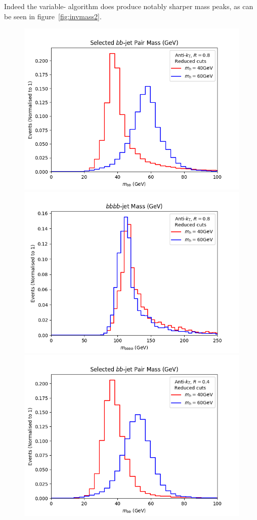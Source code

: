 Indeed the variable-\stoppingdeltar{} algorithm does produce notably sharper mass peaks,
as can be seen in figure~\ref{fig:invmass2}.

\begin{figure}[htb!]
	\includegraphics[scale=0.5]{plots/bbmass_AK8_lowptcut.png}
	\includegraphics[scale=0.5]{plots/bbbbmass_AK8_lowptcut.png}
	\includegraphics[scale=0.5]{plots/bbmass_AK4_lowptcut.png}

\end{figure}
